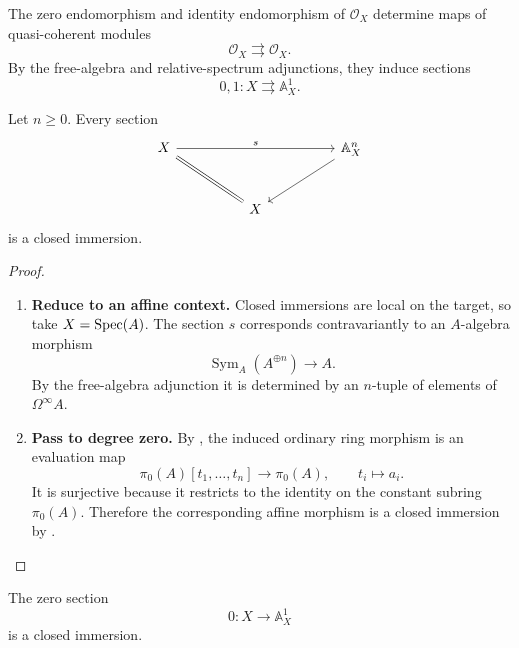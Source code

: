 \begin{construction}
\label{con:zero-unit-sections-affine-line}
The zero endomorphism and identity endomorphism of $\mathcal O_X$ determine
maps of quasi-coherent modules
\[
    \mathcal O_X
    \rightrightarrows
    \mathcal O_X.
\]
By the free-algebra and relative-spectrum adjunctions, they induce sections
\[
    0,1
    \colon
    X
    \rightrightarrows
    \mathbb A_X^1.
\]
\end{construction}

\begin{proposition}
\label{prop:affine-space-sections-closed}
Let \(n\geq0\). Every section
\[
\begin{tikzcd}[column sep=huge, row sep=large]
    X
        \arrow[rr, "s"]
        \arrow[dr, equal]
    &&
    \mathbb A_X^n
        \arrow[dl]
    \\
    & X &
\end{tikzcd}
\]
is a closed immersion.
\end{proposition}

\begin{proof}
\leavevmode
\begin{enumerate}[label=\textup{(\arabic*)}]
    \item \textbf{Reduce to an affine context.}
    Closed immersions are local on the target, so take \(X=\operatorname{Spec}(A)\). The
    section \(s\) corresponds contravariantly to an \(A\)-algebra morphism
    \[
        \operatorname{Sym}_A(A^{\oplus n})
        \longrightarrow
        A.
    \]
    By the free-algebra adjunction it is determined by an \(n\)-tuple of
    elements of \(\Omega^\infty A\).

    \item \textbf{Pass to degree zero.}
    By , the induced ordinary ring
    morphism is an evaluation map
    \[
        \pi_0(A)[t_1,\ldots,t_n]
        \longrightarrow
        \pi_0(A),
        \qquad
        t_i\longmapsto a_i.
    \]
    It is surjective because it restricts to the identity on the constant
    subring \(\pi_0(A)\). Therefore the corresponding affine morphism is a
    closed immersion by .
\end{enumerate}
\end{proof}

\begin{proposition}
\label{prop:zero-section-affine-line-closed}
The zero section
\[
    0
    \colon
    X
    \longrightarrow
    \mathbb A_X^1
\]
is a closed immersion.
\end{proposition}

